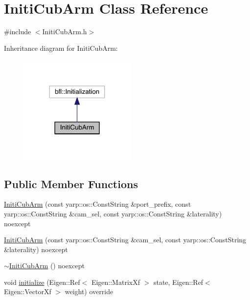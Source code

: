 \hypertarget{classInitiCubArm}{}\section{Initi\+Cub\+Arm Class Reference}
\label{classInitiCubArm}


{\ttfamily \#include $<$Initi\+Cub\+Arm.\+h$>$}



Inheritance diagram for Initi\+Cub\+Arm\+:
\nopagebreak
\begin{figure}[H]
\begin{center}
\leavevmode
\includegraphics[width=164pt]{classInitiCubArm__inherit__graph}
\end{center}
\end{figure}
\subsection*{Public Member Functions}
\begin{DoxyCompactItemize}
\item 
\hyperlink{classInitiCubArm_aa59e8d0c6da59fcde27daec16e560cbf}{Initi\+Cub\+Arm} (const yarp\+::os\+::\+Const\+String \&port\+\_\+prefix, const yarp\+::os\+::\+Const\+String \&cam\+\_\+sel, const yarp\+::os\+::\+Const\+String \&laterality) noexcept
\item 
\hyperlink{classInitiCubArm_affa3e5d97a2f24f3e3fd2030a0dd5dbc}{Initi\+Cub\+Arm} (const yarp\+::os\+::\+Const\+String \&cam\+\_\+sel, const yarp\+::os\+::\+Const\+String \&laterality) noexcept
\item 
\hyperlink{classInitiCubArm_a337d96e7aecbd9235b3734c2aa317429}{$\sim$\+Initi\+Cub\+Arm} () noexcept
\item 
void \hyperlink{classInitiCubArm_a6f28c13828b5b90366b1105aef5820e3}{initialize} (Eigen\+::\+Ref$<$ Eigen\+::\+Matrix\+Xf $>$ state, Eigen\+::\+Ref$<$ Eigen\+::\+Vector\+Xf $>$ weight) override
\end{DoxyCompactItemize}
